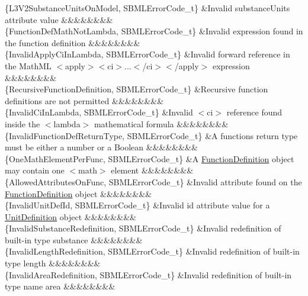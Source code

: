\begin{DoxyParagraph}{}
\begin{longtabu}
\{L3\+V2\+Substance\+Units\+On\+Model, S\+B\+M\+L\+Error\+Code\+\_\+t\} &Invalid \textquotesingle{}substance\+Units\textquotesingle{} attribute value &&&&&&&&\\
\{Function\+Def\+Math\+Not\+Lambda, S\+B\+M\+L\+Error\+Code\+\_\+t\} &Invalid expression found in the function definition &&&&&&&&\\
\{Invalid\+Apply\+Ci\+In\+Lambda, S\+B\+M\+L\+Error\+Code\+\_\+t\} &Invalid forward reference in the Math\+ML {\ttfamily $<$apply$>$}{\ttfamily $<$ci$>$}...{\ttfamily $<$/ci$>$}{\ttfamily $<$/apply$>$} expression &&&&&&&&\\
\{Recursive\+Function\+Definition, S\+B\+M\+L\+Error\+Code\+\_\+t\} &Recursive function definitions are not permitted &&&&&&&&\\
\{Invalid\+Ci\+In\+Lambda, S\+B\+M\+L\+Error\+Code\+\_\+t\} &Invalid {\ttfamily $<$ci$>$} reference found inside the {\ttfamily $<$lambda$>$} mathematical formula &&&&&&&&\\
\{Invalid\+Function\+Def\+Return\+Type, S\+B\+M\+L\+Error\+Code\+\_\+t\} &A function\textquotesingle{}s return type must be either a number or a Boolean &&&&&&&&\\
\{One\+Math\+Element\+Per\+Func, S\+B\+M\+L\+Error\+Code\+\_\+t\} &A \hyperlink{class_function_definition}{Function\+Definition} object may contain one {\ttfamily $<$math$>$} element &&&&&&&&\\
\{Allowed\+Attributes\+On\+Func, S\+B\+M\+L\+Error\+Code\+\_\+t\} &Invalid attribute found on the \hyperlink{class_function_definition}{Function\+Definition} object &&&&&&&&\\
\{Invalid\+Unit\+Def\+Id, S\+B\+M\+L\+Error\+Code\+\_\+t\} &Invalid \textquotesingle{}id\textquotesingle{} attribute value for a \hyperlink{class_unit_definition}{Unit\+Definition} object &&&&&&&&\\
\{Invalid\+Substance\+Redefinition, S\+B\+M\+L\+Error\+Code\+\_\+t\} &Invalid redefinition of built-\/in type \textquotesingle{}substance\textquotesingle{} &&&&&&&&\\
\{Invalid\+Length\+Redefinition, S\+B\+M\+L\+Error\+Code\+\_\+t\} &Invalid redefinition of built-\/in type \textquotesingle{}length\textquotesingle{} &&&&&&&&\\
\{Invalid\+Area\+Redefinition, S\+B\+M\+L\+Error\+Code\+\_\+t\} &Invalid redefinition of built-\/in type name \textquotesingle{}area\textquotesingle{} &&&&&&&&\\

\end{longtabu}
\end{DoxyParagraph}

